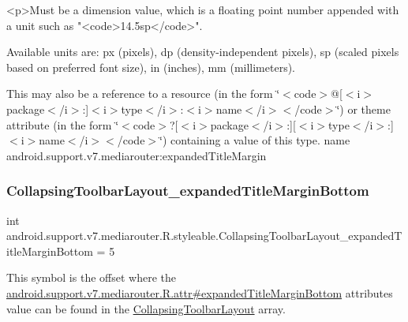 \begin{DoxyVerb}      <p>Must be a dimension value, which is a floating point number appended with a unit such as "<code>14.5sp</code>".
\end{DoxyVerb}
 Available units are\+: px (pixels), dp (density-\/independent pixels), sp (scaled pixels based on preferred font size), in (inches), mm (millimeters). 

This may also be a reference to a resource (in the form \char`\"{}$<$code$>$@\mbox{[}$<$i$>$package$<$/i$>$\+:\mbox{]}$<$i$>$type$<$/i$>$\+:$<$i$>$name$<$/i$>$$<$/code$>$\char`\"{}) or theme attribute (in the form \char`\"{}$<$code$>$?\mbox{[}$<$i$>$package$<$/i$>$\+:\mbox{]}\mbox{[}$<$i$>$type$<$/i$>$\+:\mbox{]}$<$i$>$name$<$/i$>$$<$/code$>$\char`\"{}) containing a value of this type.  name android.\+support.\+v7.\+mediarouter\+:expanded\+Title\+Margin \mbox{\label{classandroid_1_1support_1_1v7_1_1mediarouter_1_1R_1_1styleable_ac08783d2f2f6cd0a8b8e66d9fc4f7c4c}} 
\subsubsection{\texorpdfstring{Collapsing\+Toolbar\+Layout\+\_\+expanded\+Title\+Margin\+Bottom}{CollapsingToolbarLayout\_expandedTitleMarginBottom}}
{\footnotesize\ttfamily int android.\+support.\+v7.\+mediarouter.\+R.\+styleable.\+Collapsing\+Toolbar\+Layout\+\_\+expanded\+Title\+Margin\+Bottom = 5\hspace{0.3cm}{\ttfamily [static]}}

This symbol is the offset where the \hyperlink{classandroid_1_1support_1_1v7_1_1mediarouter_1_1R_1_1attr_ad6238ed40f45c1ed7c04c31149a75682}{android.\+support.\+v7.\+mediarouter.\+R.\+attr\#expanded\+Title\+Margin\+Bottom} attribute\textquotesingle{}s value can be found in the \hyperlink{classandroid_1_1support_1_1v7_1_1mediarouter_1_1R_1_1styleable_aae2cb4975e9b9a19d129888f497cc386}{Collapsing\+Toolbar\+Layout} array.

